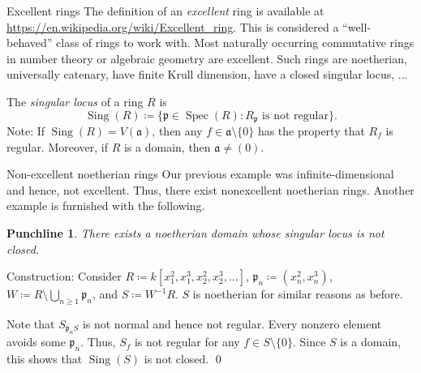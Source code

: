 \documentclass{beamer}
\newtheorem{punchline}[theorem]{Punchline}
\DeclareMathOperator{\Sing}{Sing}
\DeclareMathOperator{\Spec}{Spec}
\begin{document}
	\begin{frame}{Excellent rings}
		The definition of an \emph{excellent} ring is available at \url{https://en.wikipedia.org/wiki/Excellent_ring}. \pause This is considered a ``well-behaved'' class of rings to work with. \pause Most naturally occurring commutative rings in number theory or algebraic geometry are excellent. \pause Such rings are noetherian, \pause universally catenary, \pause have finite Krull dimension, \pause have a closed singular locus, ... \pause

		The \emph{singular locus} of a ring $R$ is 
		\begin{equation*} 
			\Sing(R) \coloneqq \{\mathfrak{p} \in \Spec(R) : R_{\mathfrak{p}} \text{ is not regular}\}.
		\end{equation*} \pause
		Note: If $\Sing(R) = V(\mathfrak{a})$, then any $f \in \mathfrak{a} \setminus \{0\}$ has the property that $R_{f}$ is regular. \pause \newline
		Moreover, if $R$ is a domain, then $\mathfrak{a} \neq (0)$.
	\end{frame}
	\begin{frame}{Non-excellent noetherian rings}
		Our previous example was infinite-dimensional and hence, not excellent. \pause Thus, there exist nonexcellent noetherian rings. \pause Another example is furnished with the following.
		\begin{punchline}
			There exists a noetherian domain whose singular locus is not closed.
		\end{punchline} \pause
		Construction: Consider $R \coloneqq k[x_{1}^{2}, x_{1}^{3}, x_{2}^{2}, x_{2}^{3}, \ldots]$, \pause $\mathfrak{p}_{n} \coloneqq (x_{n}^{2}, x_{n}^{3})$, \pause $W \coloneqq R \setminus \bigcup_{n \ge 1} \mathfrak{p}_{n}$, \pause and $S \coloneqq W^{-1} R$. \pause $S$ is noetherian for similar reasons as before. \pause

		Note that $S_{\mathfrak{p}_{n} S}$ is not normal and hence not regular. \pause Every nonzero element avoids some $\mathfrak{p}_{n}$. \pause Thus, $S_{f}$ is not regular for any $f \in S \setminus \{0\}$. \pause Since $S$ is a domain, this shows that $\Sing(S)$ is not closed. \qed
	\end{frame}
\end{document}
